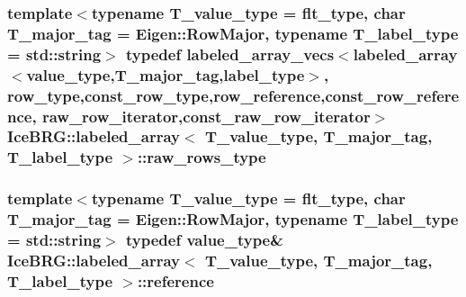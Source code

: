 \subsubsection[{raw\+\_\+rows\+\_\+type}]{\setlength{\rightskip}{0pt plus 5cm}template$<$typename T\+\_\+value\+\_\+type = flt\+\_\+type, char T\+\_\+major\+\_\+tag = Eigen\+::\+Row\+Major, typename T\+\_\+label\+\_\+type = std\+::string$>$ typedef {\bf labeled\+\_\+array\+\_\+vecs}$<${\bf labeled\+\_\+array}$<${\bf value\+\_\+type},T\+\_\+major\+\_\+tag,{\bf label\+\_\+type}$>$, {\bf row\+\_\+type},{\bf const\+\_\+row\+\_\+type},{\bf row\+\_\+reference},{\bf const\+\_\+row\+\_\+reference}, {\bf raw\+\_\+row\+\_\+iterator},{\bf const\+\_\+raw\+\_\+row\+\_\+iterator}$>$ {\bf Ice\+B\+R\+G\+::labeled\+\_\+array}$<$ T\+\_\+value\+\_\+type, T\+\_\+major\+\_\+tag, T\+\_\+label\+\_\+type $>$\+::{\bf raw\+\_\+rows\+\_\+type}}\label{classIceBRG_1_1labeled__array_a87c569635102ad3390845861bc9cf5cc}
\hypertarget{classIceBRG_1_1labeled__array_a2842648890bc2655f359ccfd4cb5ed63}{}
\subsubsection[{reference}]{\setlength{\rightskip}{0pt plus 5cm}template$<$typename T\+\_\+value\+\_\+type = flt\+\_\+type, char T\+\_\+major\+\_\+tag = Eigen\+::\+Row\+Major, typename T\+\_\+label\+\_\+type = std\+::string$>$ typedef {\bf value\+\_\+type}\& {\bf Ice\+B\+R\+G\+::labeled\+\_\+array}$<$ T\+\_\+value\+\_\+type, T\+\_\+major\+\_\+tag, T\+\_\+label\+\_\+type $>$\+::{\bf reference}}\label{classIceBRG_1_1labeled__array_a2842648890bc2655f359ccfd4cb5ed63}
\hypertarget{classIceBRG_1_1labeled__array_aacd98fdd793a8e3e937485151d8ecf27}{}
